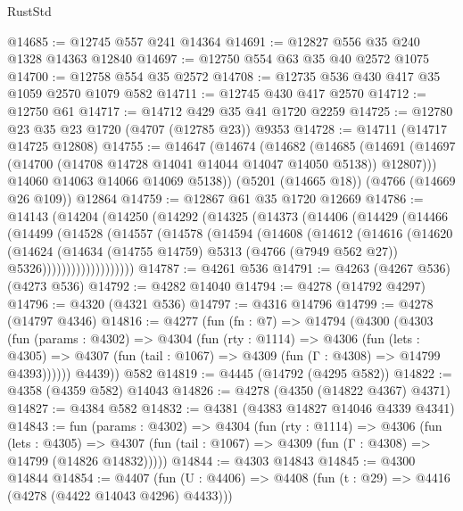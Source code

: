 \begin{lexlean}{RustStd}
\begin{coremodule}
@14685 := @12745 @557 @241 @14364
@14691 := @12827 @556 @35 @240 @1328 @14363 @12840
@14697 := @12750 @554 @63 @35 @40 @2572 @1075
@14700 := @12758 @554 @35 @2572
@14708 := @12735 @536 @430 @417 @35 @1059 @2570 @1079 @582
@14711 := @12745 @430 @417 @2570
@14712 := @12750 @61
@14717 := @14712 @429 @35 @41 @1720 @2259
@14725 := @12780 @23 @35 @23 @1720 (@4707 (@12785 @23)) @9353
@14728 := @14711 (@14717 @14725 @12808)
@14755 := @14647
    (@14674
      (@14682
        (@14685 (@14691 (@14697 (@14700 (@14708 @14728 @14041 @14044 @14047 @14050 @5138)) @12807)))
        @14060
        @14063
        @14066
        @14069
        @5138))
    (@5201 (@14665 @18))
    (@4766 (@14669 @26 @109))
    @12864
@14759 := @12867 @61 @35 @1720 @12669
@14786 := @14143
    (@14204
      (@14250
        (@14292
          (@14325
            (@14373
              (@14406
                (@14429
                  (@14466
                    (@14499
                      (@14528
                        (@14557
                          (@14578
                            (@14594
                              (@14608
                                (@14612
                                  (@14616
                                    (@14620
                                      (@14624
                                        (@14634
                                          (@14755 @14759)
                                          @5313
                                          (@4766 (@7949 @562 @27))
                                          @5326)))))))))))))))))))
@14787 := @4261 @536
@14791 := @4263 (@4267 @536) (@4273 @536)
@14792 := @4282 @14040
@14794 := @4278 (@14792 @4297)
@14796 := @4320 (@4321 @536)
@14797 := @4316 @14796
@14799 := @4278 (@14797 @4346)
@14816 := @4277
    (fun (fn : @7) =>
    @14794
      (@4300
        (@4303
          (fun (params : @4302) =>
          @4304
            (fun (rty : @1114) =>
            @4306
              (fun (lets : @4305) =>
              @4307 (fun (tail : @1067) => @4309 (fun (Γ : @4308) => @14799 @4393))))))
        @4439))
    @582
@14819 := @4445 (@14792 (@4295 @582))
@14822 := @4358 (@4359 @582) @14043
@14826 := @4278 (@4350 (@14822 @4367) @4371)
@14827 := @4384 @582
@14832 := @4381 (@4383 @14827 @14046 @4339 @4341)
@14843 := fun (params : @4302) =>
  @4304
    (fun (rty : @1114) =>
    @4306
      (fun (lets : @4305) =>
      @4307 (fun (tail : @1067) => @4309 (fun (Γ : @4308) => @14799 (@14826 @14832)))))
@14844 := @4303 @14843
@14845 := @4300 @14844
@14854 := @4407
    (fun (U : @4406) => @4408 (fun (t : @29) => @4416 (@4278 (@4422 @14043 @4296) @4433)))

\end{coremodule}
\end{lexlean}

